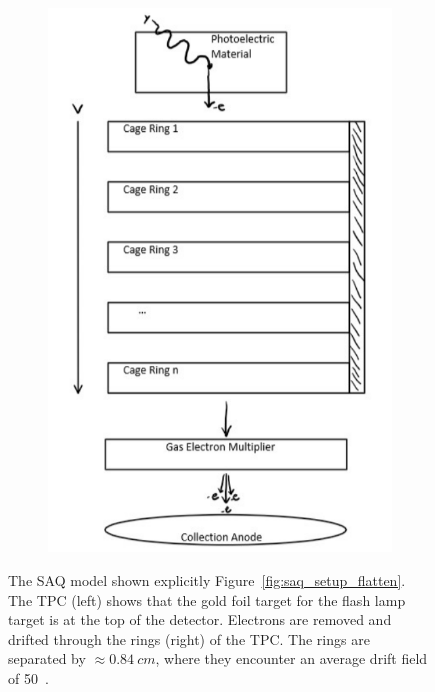 \begin{figure}[]
\begin{subfigure}{.38\textwidth}
  \includegraphics[width=\textwidth]{images/saq_rings_insides.png}
  \caption{}
\end{subfigure}
\caption{The SAQ model shown explicitly Figure~\ref{fig:saq_setup_flatten}.
The TPC (left) shows that the gold foil target for the flash lamp target is at the top of the detector.
Electrons are removed and drifted through the rings (right) of the TPC.
The rings are separated by $\approx 0.84~\unit{cm}$, where they encounter an average drift field of 50~\unit{}.
}
\label{fig:saq_physical_setup_flatten}
\end{figure}

